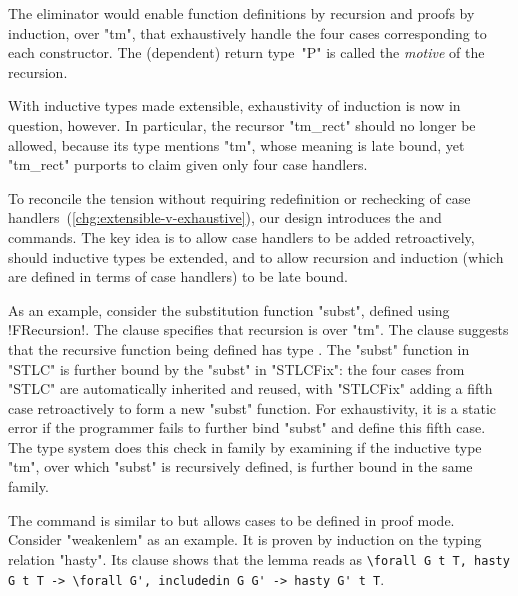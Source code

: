 \noindent
The eliminator would enable function definitions by recursion
and proofs by induction, over "tm", that exhaustively
handle the four cases corresponding to each constructor.
The (dependent) return type~"P" is called the \emph{motive} of the recursion.

With inductive types made extensible, exhaustivity of induction is now
in question, however.
In particular, the recursor "tm_rect" should no longer be allowed, because
its type mentions "tm", whose meaning is late bound, yet
"tm_rect" purports to claim  given only four case handlers.

To reconcile the tension without requiring redefinition or rechecking of
case handlers~(\ref{chg:extensible-v-exhaustive}),
our design introduces the  and  commands.
The key idea is to allow case handlers to be added retroactively, should
inductive types be extended, and to allow recursion and induction (which are defined in terms of case handlers) to be late bound.

As an example, consider the substitution function "subst", defined using
\lsti!FRecursion!.
The  clause specifies that recursion is over "tm".
The  clause suggests that the recursive function being
defined has type .
%
The "subst" function in "STLC" is further bound by the "subst" in "STLCFix":
the four cases from "STLC" are automatically inherited and reused,
with "STLCFix" adding a fifth case retroactively to form a new "subst" function.
%
For exhaustivity, it is a static error if the programmer fails to
further bind "subst" and define this fifth case.
The type system does this check in family 
by examining if the inductive type "tm",
over which "subst" is recursively defined, is further bound in the same family.

The  command is similar to  but
allows cases to be defined in proof mode.
Consider "weakenlem" as an example.
It is proven by induction on the typing relation "hasty".
Its  clause shows that the lemma reads as
\lstinline[basicstyle=\fontsize{8}{9}\ttfamily]!\forall G t T, hasty G t T -> \forall G', includedin G G' -> hasty G' t T!.


